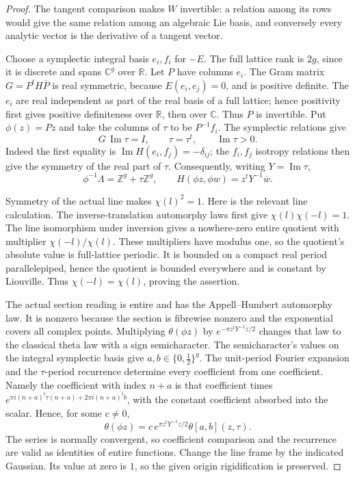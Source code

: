\begin{proof}
The tangent comparison makes \(W\) invertible: a relation
among its rows would give the same relation among an
algebraic Lie basis, and conversely every analytic
vector is the derivative of a tangent vector.

Choose a symplectic integral basis \(e_i,f_i\) for \(-E\).
The full lattice rank is \(2g\), since it is discrete and
spans \(\mathbb C^g\) over \(\mathbb R\).
Let \(P\) have columns \(e_i\).
The Gram matrix \(G=P^tH\overline P\) is real symmetric,
because \(E(e_i,e_j)=0\), and is positive definite.
The \(e_i\) are real independent as part of the real
basis of a full lattice; hence positivity first gives
positive definiteness over \(\mathbb R\), then over
\(\mathbb C\).  Thus \(P\) is invertible.
Put \(\phi(z)=Pz\) and take the columns of \(\tau\) to
be \(P^{-1}f_i\).
The symplectic relations give
\[
 G\,\operatorname{Im}\tau=I,\qquad
 \tau=\tau^t,\qquad \operatorname{Im}\tau>0.
\]
Indeed the first equality is
\(\operatorname{Im}H(e_i,f_j)=-\delta_{ij}\);
the \(f_i,f_j\) isotropy relations then give the
symmetry of the real part of \(\tau\).
Consequently, writing \(Y=\operatorname{Im}\tau\),
\[
 \phi^{-1}\Lambda=\mathbb Z^g+\tau\mathbb Z^g,
 \qquad H(\phi z,\phi w)=z^tY^{-1}\overline w.
 \tag{A3}\label{eq:ftb-key-ah-coordinate-change}
\]

Symmetry of the actual line makes \(\chi(l)^2=1\).
Here is the relevant line calculation.
The inverse-translation automorphy laws first give
\(\chi(l)\chi(-l)=1\).
The line isomorphism under inversion gives a nowhere-zero
entire quotient with multiplier \(\chi(-l)/\chi(l)\).
These multipliers have modulus one, so the quotient's
absolute value is full-lattice periodic.
It is bounded on a compact real period parallelepiped,
hence the quotient is bounded everywhere and is constant
by Liouville.
Thus \(\chi(-l)=\chi(l)\), proving the assertion.

The actual section reading is entire and has the
Appell--Humbert automorphy law.
It is nonzero because the section is fibrewise nonzero
and the exponential covers all complex points.
Multiplying \(\theta(\phi z)\) by
\(e^{-\pi z^tY^{-1}z/2}\) changes that law to the classical
theta law with a sign semicharacter.
The semicharacter's values on the integral symplectic
basis give \(a,b\in\{0,\tfrac12\}^g\).
The unit-period Fourier expansion and the \(\tau\)-period
recurrence determine every coefficient from one
coefficient.  Namely the coefficient with index \(n+a\)
is that coefficient times
\(e^{\pi i(n+a)^t\tau(n+a)+2\pi i(n+a)^tb}\),
with the constant coefficient absorbed into the scalar.
Hence, for some \(c\ne0\),
\[
 \theta(\phi z)=
       c\,e^{\pi z^tY^{-1}z/2}\theta[a,b](z,\tau).
 \tag{A4}\label{eq:ftb-key-gaussian-gauge}
\]
The series is normally convergent, so coefficient comparison
and the recurrence are valid as identities of entire
functions.  Change the line frame by the indicated
Gaussian.  Its value at zero is \(1\), so the given origin
rigidification is preserved.


\end{proof}
